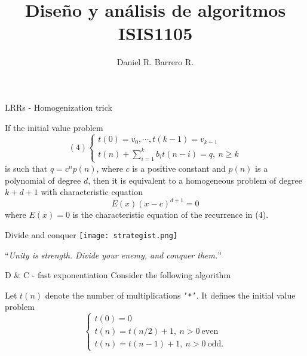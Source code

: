\documentclass{beamer}
\title{Diseño y análisis de algoritmos \\ ISIS1105}
\author{Daniel R. Barrero R.}
\institute{Universidad de los Andes}
\begin{document}
\frame{\titlepage}

%

\begin{frame}{LRRs - Homogenization trick}
	\begin{thm}[2]\label{ht}
		If the initial value problem
		\begin{displaymath}(4)
			\begin{cases}
				t(0)= v_0, \cdots, t(k-1)= v_{k-1}\\
				t(n) + \sum_{i= 1}^k b_it(n-i)= q,\ n \geq k
			\end{cases}
		\end{displaymath}
		is such that $q = c^np(n)$, where $c$ is a positive constant and
		$p(n)$ is a polynomial of degree $d$, then it is equivalent to a
		homogeneous problem of degree $k+d+1$ with characteristic equation
		\begin{equation*}
			E(x)(x-c)^{d+1} = 0
		\end{equation*}
		where $E(x) = 0$ is the characteristic equation of the recurrence
		in (4).
	\end{thm}
\end{frame}

\begin{frame}{Divide and conquer}
	\centering
	\texttt{[image: strategist.png]}
	
	\bigskip
	``\emph{Unity is strength. Divide your enemy, and conquer them.}''
\end{frame}

%

\begin{frame}{D \& C - fast exponentiation}
	Consider the following algorithm
	
	
	
	Let $t(n)$ denote the number of multiplications \texttt{'*'}. It defines the
	initial value problem
	\[
		\begin{cases}
			t(0)= 0\\
			t(n)= t(n/2) + 1,\ n > 0\ \text{even}\\
			t(n)= t(n-1) + 1,\ n > 0\ \text{odd}.
		\end{cases}
	\]
\end{frame}

%
\end{document}
